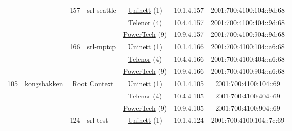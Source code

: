\begin{small}
\begin{center}
\begin{longtable}{|c|c|c|c|c|c|c|c|}
  &  & \multirow{3}{*}{\tiny{157}} & \multicolumn{1}{|l|}{\multirow{3}{*}{\tiny{srl-seattle}}} & \multicolumn{2}{|c|}{\tiny{\href{https://www.uninett.no}{Uninett} (1)}} & \tiny{10.1.4.157} & \tiny{2001:700:4100:104::9d:68} \\* \cline{5-5}\cline{6-6}\cline{7-7}\cline{8-8}
  &  &  &  & \multicolumn{2}{|c|}{\tiny{\href{https://www.telenor.no}{Telenor} (4)}} & \tiny{10.4.4.157} & \tiny{2001:700:4100:404::9d:68} \\* \cline{5-5}\cline{6-6}\cline{7-7}\cline{8-8}
  &  &  &  & \multicolumn{2}{|c|}{\tiny{\href{http://www.powertech.no}{PowerTech} (9)}} & \tiny{10.9.4.157} & \tiny{2001:700:4100:904::9d:68} \\* \cline{3-3}\cline{4-4}\cline{5-5}\cline{6-6}\cline{7-7}\cline{8-8}
  &  & \multirow{3}{*}{\tiny{166}} & \multicolumn{1}{|l|}{\multirow{3}{*}{\tiny{srl-mptcp}}} & \multicolumn{2}{|c|}{\tiny{\href{https://www.uninett.no}{Uninett} (1)}} & \tiny{10.1.4.166} & \tiny{2001:700:4100:104::a6:68} \\* \cline{5-5}\cline{6-6}\cline{7-7}\cline{8-8}
  &  &  &  & \multicolumn{2}{|c|}{\tiny{\href{https://www.telenor.no}{Telenor} (4)}} & \tiny{10.4.4.166} & \tiny{2001:700:4100:404::a6:68} \\* \cline{5-5}\cline{6-6}\cline{7-7}\cline{8-8}
  &  &  &  & \multicolumn{2}{|c|}{\tiny{\href{http://www.powertech.no}{PowerTech} (9)}} & \tiny{10.9.4.166} & \tiny{2001:700:4100:904::a6:68} \\ \hline
 \multirow{21}{*}{\tiny{105}} & \multicolumn{1}{|l|}{\multirow{21}{*}{\tiny{kongsbakken}}} & \multicolumn{2}{|c|}{\multirow{3}{*}{\tiny{Root Context}}} & \multicolumn{2}{|c|}{\tiny{\href{https://www.uninett.no}{Uninett} (1)}} & \tiny{10.1.4.105} & \tiny{2001:700:4100:104::69} \\* \cline{5-5}\cline{6-6}\cline{7-7}\cline{8-8}
  &  & \multicolumn{2}{|c|}{} & \multicolumn{2}{|c|}{\tiny{\href{https://www.telenor.no}{Telenor} (4)}} & \tiny{10.4.4.105} & \tiny{2001:700:4100:404::69} \\* \cline{5-5}\cline{6-6}\cline{7-7}\cline{8-8}
  &  & \multicolumn{2}{|c|}{} & \multicolumn{2}{|c|}{\tiny{\href{http://www.powertech.no}{PowerTech} (9)}} & \tiny{10.9.4.105} & \tiny{2001:700:4100:904::69} \\* \cline{3-3}\cline{4-4}\cline{5-5}\cline{6-6}\cline{7-7}\cline{8-8}
  &  & \multirow{3}{*}{\tiny{124}} & \multicolumn{1}{|l|}{\multirow{3}{*}{\tiny{srl-test}}} & \multicolumn{2}{|c|}{\tiny{\href{https://www.uninett.no}{Uninett} (1)}} & \tiny{10.1.4.124} & \tiny{2001:700:4100:104::7c:69} \\* \cline{5-5}\cline{6-6}\cline{7-7}\cline{8-8}

\end{longtable}
\end{center}
\end{small}
